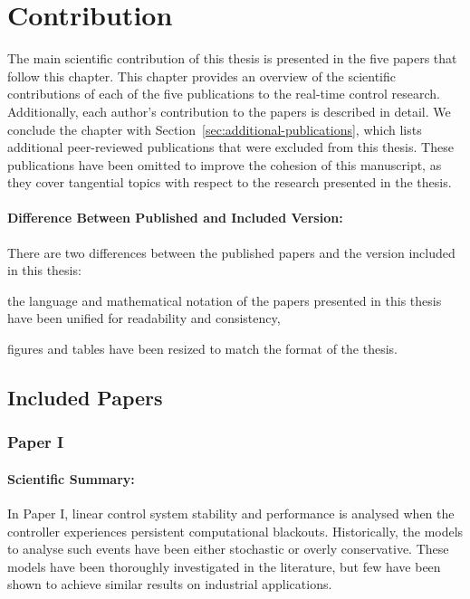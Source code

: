 \chapter{Contribution}%
\label{ch:contribution}%
%
The main scientific contribution of this thesis is presented in the five papers that follow this chapter.
This chapter provides an overview of the scientific contributions of each of the five publications to the real-time control research.
Additionally, each author's contribution to the papers is described in detail.
We conclude the chapter with Section~\ref{sec:additional-publications}, which lists additional peer-reviewed publications that were excluded from this thesis.
These publications have been omitted to improve the cohesion of this manuscript, as they cover tangential topics with respect to the research presented in the thesis.

\subsubsection*{Difference Between Published and Included Version:}%
There are two differences between the published papers and the version included in this thesis:
%
\begin{enumerate*}[label=(\roman*)]
    \item the language and mathematical notation of the papers presented in this thesis have been unified for readability and consistency,
    \item figures and tables have been resized to match the format of the thesis.
\end{enumerate*}


\section{Included Papers}%
\label{sec:paper-summaries}%
%
\subsection*{Paper I}%
%
\begin{quote}
\end{quote}

\subsubsection*{Scientific Summary:}%
%
In Paper I, linear control system stability and performance is analysed when the controller experiences persistent computational blackouts.
Historically, the models to analyse such events have been either stochastic or overly conservative.
These models have been thoroughly investigated in the literature, but few have been shown to achieve similar results on industrial applications.

